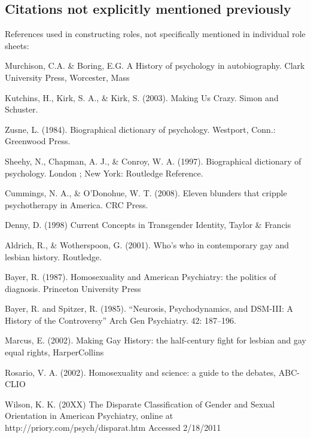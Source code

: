 \begin{refsection}
\begin{appendices}
\section{Citations not explicitly mentioned previously}
\label{citationsnotexplicitlymentionedpreviously}

References used in constructing roles, not specifically mentioned in individual role sheets:

Murchison, C.A. \& Boring, E.G. A History of psychology in autobiography. Clark University Press, Worcester, Mass

Kutchins, H., Kirk, S. A., \& Kirk, S. (2003). Making Us Crazy. Simon and Schuster.

Zusne, L. (1984). Biographical dictionary of psychology. Westport, Conn.: Greenwood Press.

Sheehy, N., Chapman, A. J., \& Conroy, W. A. (1997). Biographical dictionary of psychology. London ; New York: Routledge Reference.

Cummings, N. A., \& O'Donohue, W. T. (2008). Eleven blunders that cripple psychotherapy in America. CRC Press.

Denny, D. (1998) Current Concepts in Transgender Identity, Taylor \& Francis

Aldrich, R., \& Wotherspoon, G. (2001). Who's who in contemporary gay and lesbian history. Routledge.

Bayer, R. (1987). Homosexuality and American Psychiatry: the politics of diagnosis. Princeton University Press

Bayer, R. and Spitzer, R. (1985). ``Neurosis, Psychodynamics, and DSM-III: A History of the Controversy'' Arch Gen Psychiatry. 42: 187--196.

Marcus, E. (2002). Making Gay History: the half-century fight for lesbian and gay equal rights, HarperCollins

Rosario, V. A. (2002). Homosexuality and science: a guide to the debates, ABC-CLIO

Wilson, K. K. (20XX) The Disparate Classification of Gender and Sexual Orientation in American Psychiatry, online at http:\slash \slash priory.com\slash psych\slash disparat.htm Accessed 2\slash 18\slash 2011

\end{appendices}
\end{refsection}

\pagebreak 

 
\frontmatter
\tableofcontents
\newpage
\listoftables
\newpage
\listoffigures
\newpage

